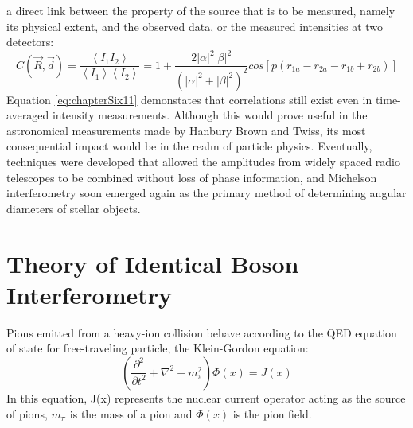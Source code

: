 a direct link between the property of the source that is to be measured, namely its physical extent,%
and the observed data, or the measured intensities at two detectors:
\begin{equation}
  \label{eq:chapterSix11}
  C(\vec{R}, \vec{d}) = \frac{\left<I_{1}I_{2}\right>}{\left<I_{1}\right>\left<I_{2}\right>} = 1 + \frac{2|\alpha|^{2}|\beta|^{2}}{(|\alpha|^{2}+|\beta|^{2})^{2}}cos[p(r_{1a}-r_{2a}-r_{1b}+r_{2b})]
\end{equation}
Equation \ref{eq:chapterSix11} demonstates that correlations still exist even in time-averaged intensity measurements.%
Although this would prove useful in the astronomical measurements made by Hanbury Brown and Twiss,%
its most consequential impact would be in the realm of particle physics.%
Eventually, techniques were developed that allowed the amplitudes from widely spaced radio telescopes to be
combined without loss of phase information,%
and Michelson interferometry soon emerged again as the primary method of determining angular diameters of stellar objects.

\section{Theory of Identical Boson Interferometry}
Pions emitted from a heavy-ion collision behave according to the QED equation of state for free-traveling particle, the Klein-Gordon equation:
\begin{equation}
  \label{eq:chapterSix12}
  \left(\frac{\partial^{2}}{\partial{t^{2}}} + \nabla^{2} + m_{\pi}^{2}\right)\Phi(x) = J(x)
\end{equation}
In this equation, J(x) represents the nuclear current operator acting as the source of pions,%
$m_{\pi}$ is the mass of a pion and $\Phi(x)$ is the pion field.%

